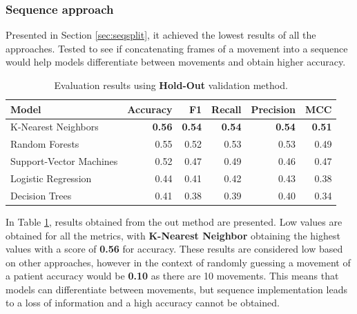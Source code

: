             \subsubsection{Sequence approach}

                Presented in Section \ref{sec:seqsplit}, it achieved the lowest results of all the approaches. Tested to see if concatenating frames of a movement into a sequence would help models differentiate between movements and obtain higher accuracy. 
                
                \begin{table}[htbp]
                    \centering
                    \begin{tabular}{lrrrrr}
                        \toprule
                        \textbf{Model} & \textbf{Accuracy} & \textbf{F1} & \textbf{Recall} & \textbf{Precision} & \textbf{MCC} \\
                        \midrule
                        K-Nearest Neighbors & \textbf{0.56} & \textbf{0.54} & \textbf{0.54} & \textbf{0.54} & \textbf{0.51} \\
                        Random Forests & 0.55 & 0.52 & 0.53 & 0.53 & 0.49 \\
                        Support-Vector Machines& 0.52 & 0.47 & 0.49 & 0.46 & 0.47 \\
                        Logistic Regression & 0.44 & 0.41 & 0.42 & 0.43 & 0.38 \\
                        Decision Trees & 0.41 & 0.38 & 0.39 & 0.40 & 0.34 \\
                        \bottomrule
                    \end{tabular}
                    \caption{Evaluation results using \textbf{Hold-Out} validation method.}
                    \label{tab:sequence_approach_holdout}
                \end{table}

                In Table \ref{tab:sequence_approach_holdout}, results obtained from the out method are presented. Low values are obtained for all the metrics, with \textbf{K-Nearest Neighbor} obtaining the highest values with a score of \textbf{0.56} for accuracy. These results are considered low based on other approaches, however in the context of randomly guessing a movement of a patient accuracy would be \textbf{0.10} as there are 10 movements. This means that models can differentiate between movements, but sequence implementation leads to a loss of information and a high accuracy cannot be obtained.

